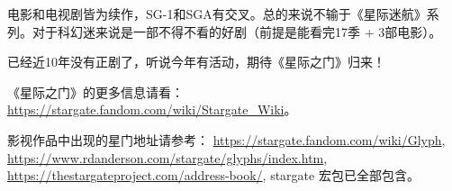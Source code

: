 \documentclass[12pt]{article}
\providecommand{\pkg}{\textsf}
\begin{document}
电影和电视剧皆为续作，SG-1和SGA有交叉。总的来说不输于《星际迷航》系列。对于科幻迷来说是一部不得不看的好剧（前提是能看完17季 + 3部电影）。

已经近10年没有正剧了，听说今年有活动，期待《星际之门》归来！

《星际之门》的更多信息请看：\url{https://stargate.fandom.com/wiki/Stargate_Wiki}。

影视作品中出现的星门地址请参考：
\url{https://stargate.fandom.com/wiki/Glyph}, \\
\url{https://www.rdanderson.com/stargate/glyphs/index.htm}, \\
\url{https://thestargateproject.com/address-book/},
\pkg{stargate} 宏包已全部包含。
\end{document}
